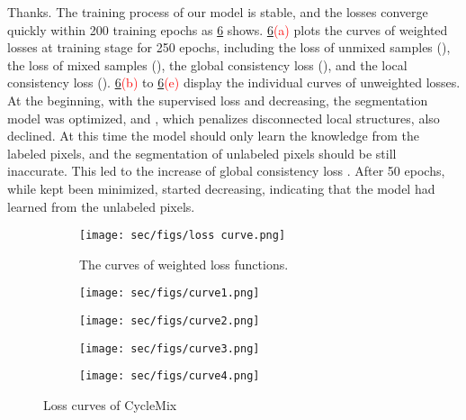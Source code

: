 \documentclass[10pt,twocolumn,letterpaper]{article}
\begin{document}
\newline{}
Thanks. 
The training process of our model is stable, and the losses converge quickly within 200 training epochs as \cref{fig:short} shows.
\cref{fig:short}\textcolor{red}{(a)} plots the curves of weighted losses at training stage for 250 epochs,
including the loss of unmixed samples (), the loss of mixed samples (), the global consistency loss (), and the local consistency loss ().
\cref{fig:short}\textcolor{red}{(b)} to \cref{fig:short}\textcolor{red}{(e)} display the individual curves of unweighted losses.
At the beginning, with the supervised loss  and  decreasing, the segmentation model was optimized, and , which penalizes disconnected local structures, also declined.
At this time the model should only learn the knowledge from the labeled pixels, and the segmentation of unlabeled pixels should be still inaccurate.
This led to the increase of global consistency loss .
After 50 epochs, while  kept been minimized,  started decreasing, indicating that the model had learned from the unlabeled pixels. 
\begin{figure}[t!]
  \centering
  \begin{subfigure}[b]{0.95\linewidth}
         \texttt{[image: sec/figs/loss curve.png]}
         \caption{The curves of weighted loss functions.}
    \label{fig:short-a}
  \end{subfigure}
  \begin{subfigure}[b]{0.23\linewidth}
         \texttt{[image: sec/figs/curve1.png]}
         \caption{}
    \label{fig:short-b}
  \end{subfigure}
    \begin{subfigure}[b]{0.21\linewidth}
         \texttt{[image: sec/figs/curve2.png]}
         \caption{}
    \label{fig:short-c}
  \end{subfigure}
    \begin{subfigure}[b]{0.21\linewidth}
         \texttt{[image: sec/figs/curve3.png]}
         \caption{}
    \label{fig:short-d}
  \end{subfigure}
    \begin{subfigure}[b]{0.21\linewidth}
         \texttt{[image: sec/figs/curve4.png]}
         \caption{}
    \label{fig:short-e}
  \end{subfigure}
  \caption{Loss curves of CycleMix}
  \label{fig:short}
\end{figure}



{\small


}
\end{document}
